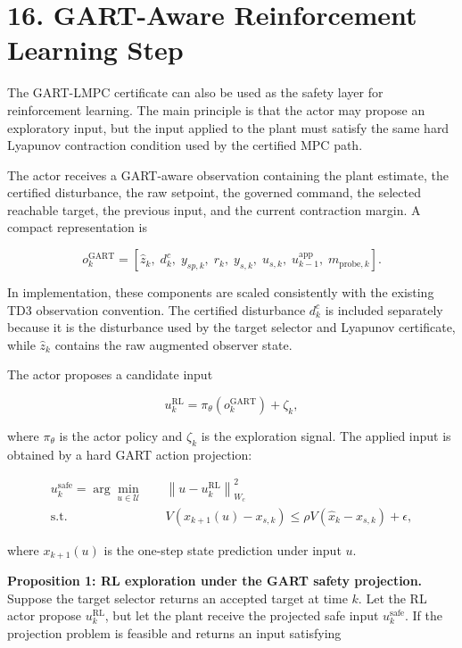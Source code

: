 \documentclass[11pt]{article}
\begin{document}
\section*{16. GART-Aware Reinforcement Learning Step}

The GART-LMPC certificate can also be used as the safety layer for reinforcement learning. The main principle is that the actor may propose an exploratory input, but the input applied to the plant must satisfy the same hard Lyapunov contraction condition used by the certified MPC path.


The actor receives a GART-aware observation containing the plant estimate, the certified disturbance, the raw setpoint, the governed command, the selected reachable target, the previous input, and the current contraction margin. A compact representation is


\[
o_k^{\mathrm{GART}}
=
\left[
\hat z_k,\;
d^c_k,\;
y_{sp,k},\;
r_k,\;
y_{s,k},\;
u_{s,k},\;
u_{k-1}^{\mathrm{app}},\;
m_{\mathrm{probe},k}
\right].
\]

In implementation, these components are scaled consistently with the existing TD3 observation convention. The certified disturbance $d^c_k$ is included separately because it is the disturbance used by the target selector and Lyapunov certificate, while $\hat z_k$ contains the raw augmented observer state.


The actor proposes a candidate input


\[
u_k^{\mathrm{RL}}
=
\pi_\theta(o_k^{\mathrm{GART}})+\zeta_k,
\]

where $\pi_\theta$ is the actor policy and $\zeta_k$ is the exploration signal. The applied input is obtained by a hard GART action projection:


\[
\begin{aligned}
u_k^{\mathrm{safe}}
=
\arg\min_{u\in\mathcal U}
\quad
&
\left\|u-u_k^{\mathrm{RL}}\right\|_{W_c}^{2}
\\
\text{s.t.}\quad
&
V(x_{k+1}(u)-x_{s,k})
\le
\rho V(\hat x_k-x_{s,k})+\epsilon,
\end{aligned}
\]

where $x_{k+1}(u)$ is the one-step state prediction under input $u$.

\textbf{Proposition 1: RL exploration under the GART safety projection.}
Suppose the target selector returns an accepted target at time $k$. Let the RL actor propose $u_k^{\mathrm{RL}}$, but let the plant receive the projected safe input $u_k^{\mathrm{safe}}$. If the projection problem is feasible and returns an input satisfying
\end{document}
